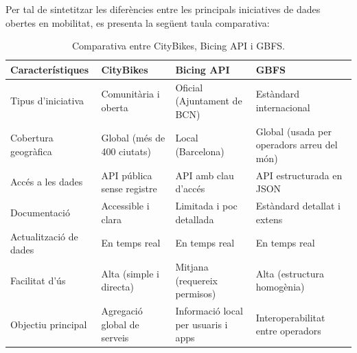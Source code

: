 Per tal de sintetitzar les diferències entre les principals iniciatives de dades obertes en mobilitat, es presenta la següent taula comparativa:

\begin{table}[htbp]
\centering
\begin{tabular}{|p{4cm}|p{3.9cm}|p{3.8cm}|p{3.5cm}|}
\hline
\textbf{Característiques} & \textbf{CityBikes} & \textbf{Bicing API} & \textbf{GBFS} \\
\hline
Tipus d’iniciativa & Comunitària i oberta & Oficial (Ajuntament de BCN) & Estàndard internacional \\
\hline
Cobertura geogràfica & Global (més de 400 ciutats) & Local (Barcelona) & Global (usada per operadors arreu del món) \\
\hline
Accés a les dades & API pública sense registre & API amb clau d’accés & API estructurada en JSON \\
\hline
Documentació & Accessible i clara & Limitada i poc detallada & Estàndard detallat i extens \\
\hline
Actualització de dades & En temps real & En temps real & En temps real \\
\hline
Facilitat d’ús & Alta (simple i directa) & Mitjana (requereix permisos) & Alta (estructura homogènia) \\
\hline
Objectiu principal & Agregació global de serveis & Informació local per usuaris i apps & Interoperabilitat entre operadors \\
\hline
\end{tabular}
\caption{Comparativa entre CityBikes, Bicing API i GBFS.}
\label{tab:comparativa_mobilitat}
\end{table}



